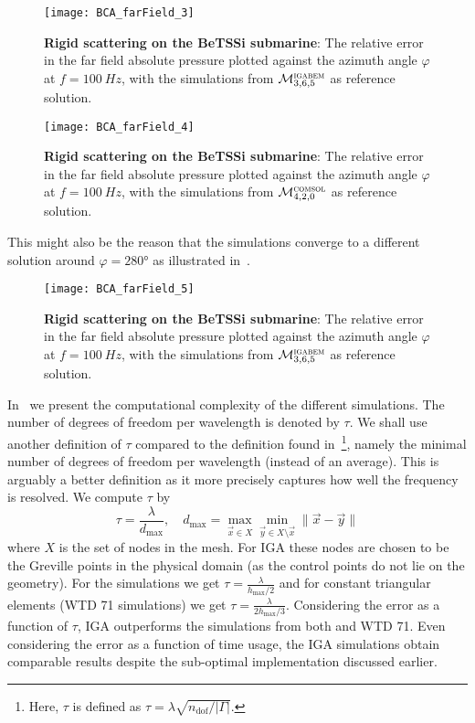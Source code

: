 \begin{figure}
	\centering
	\texttt{[image: BCA\_farField\_3]}
	\caption{\textbf{Rigid scattering on the BeTSSi submarine}: The relative error in the far field absolute pressure plotted against the azimuth angle $\varphi$ at $f = \SI{100}{Hz}$, with the simulations from ${\cal M}_{3,6,5}^{\textsc{igabem}}$ as reference solution.}
	\label{Fig3:error_BI_100_IGA}
\end{figure}
\begin{figure}
	\centering
	\texttt{[image: BCA\_farField\_4]}
	\caption{\textbf{Rigid scattering on the BeTSSi submarine}: The relative error in the far field absolute pressure plotted against the azimuth angle $\varphi$ at $f = \SI{100}{Hz}$, with the simulations from ${\cal M}_{4,2,0}^{\textsc{comsol}}$ as reference solution.}
	\label{Fig3:error_BI_100_COMSOL}
\end{figure}
This might also be the reason that the \COMSOL simulations converge to a different solution around $\varphi=\ang{280}$ as illustrated in~.
\begin{figure}
	\centering
	\texttt{[image: BCA\_farField\_5]}
	\caption{\textbf{Rigid scattering on the BeTSSi submarine}: The relative error in the far field absolute pressure plotted against the azimuth angle $\varphi$ at $f = \SI{100}{Hz}$, with the simulations from ${\cal M}_{3,6,5}^{\textsc{igabem}}$ as reference solution.}
	\label{Fig3:error_BI_100_COMSOL_IGA}
\end{figure}
In~ we present the computational complexity of the different simulations. The number of degrees of freedom per wavelength is denoted by $\tau$. We shall use another definition of $\tau$ compared to the definition found in~\cite[p. 767]{Peake2015eib}\footnote{Here, $\tau$ is defined as $\tau = \lambda\sqrt{n_{\mathrm{dof}}/|\Gamma|}$.}, namely the minimal number of degrees of freedom per wavelength (instead of an average). This is arguably a better definition as it more precisely captures how well the frequency is resolved. We compute $\tau$ by
\begin{equation*}
	\tau=\frac{\lambda}{d_{\mathrm{max}}},\quad d_{\mathrm{max}} = \max_{\vec{x}\in X}\min_{\vec{y}\in X\setminus\vec{x}}\|\vec{x}-\vec{y}\|
\end{equation*}
where $X$ is the set of nodes in the mesh. For IGA these nodes are chosen to be the Greville points in the physical domain (as the control points do not lie on the geometry). For the \COMSOL simulations we get $\tau=\frac{\lambda}{h_{\mathrm{max}}/2}$ and for constant triangular elements (WTD 71 simulations) we get ${\tau=\frac{\lambda}{2h_{\mathrm{max}}/3}}$. Considering the error as a function of $\tau$, IGA outperforms the simulations from both \COMSOL and WTD 71. Even considering the error as a function of time usage, the IGA simulations obtain comparable results despite the sub-optimal implementation discussed earlier.
